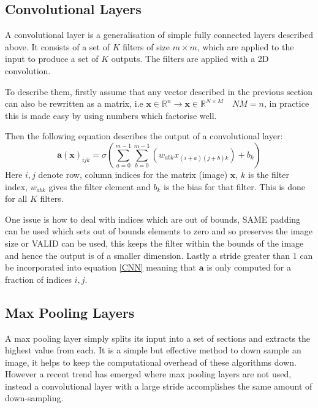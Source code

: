     \subsection{Convolutional Layers}
      A convolutional layer is a generalisation of simple fully connected layers described
      above. It consists of a set of $K$ filters of size $m\times m$, which are applied to the input to produce
      a set of $K$ outputs. The filters are applied with a 2D convolution.


      To describe them, firstly assume that any vector described in the previous section
      can also be rewritten as a matrix, i.e $\mathbf{x} \in \mathbb{R}^{n}
      \rightarrow \mathbf{x} \in \mathbb{R}^{N \times M} \quad NM=n$, in practice this is made
      easy by using numbers which factorise well.

      Then the following equation describes the output of a convolutional layer:
      \begin{equation} \label{CNN}
        \mathbf{a}(\mathbf{x})_{ijk} = \sigma \left ( \sum_{a=0}^{m-1}\sum_{b=0}^{m-1}(w_{abk}x_{(i+a)(j+b)k}) + b_k \right )
      \end{equation}
      Here $i,j$  denote row, column indices for the matrix (image) $\mathbf{x}$, $k$ is the filter index, $w_{abk}$
      gives the filter element and $b_k$ is the bias for that filter. This is done for all $K$ filters.

      One issue is how to deal with indices which are out of bounds, SAME padding can be used which sets out of bounds
      elements to zero and so preserves the image size or VALID can be used, this keeps the filter within the bounds of the
      image and hence the output is of a smaller dimension. Lastly a stride greater than 1 can be incorporated into equation
      \ref{CNN} meaning that $\mathbf{a}$ is only computed for a fraction of indices $i,j$.
    \subsection{Max Pooling Layers}
      A max pooling layer simply splits its input into a set of sections and extracts
      the highest value from each. It is a simple but effective method to down sample
      an image, it helps to keep the computational overhead of these algorithms
      down. However a recent trend \cite{Springenberg2015} has emerged where max pooling
      layers are not used, instead a convolutional layer with a large stride accomplishes
      the same amount of down-sampling.
